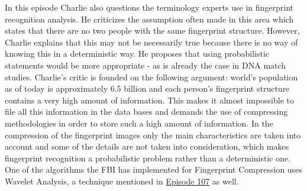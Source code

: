 In this episode Charlie also questions the terminology experts use in fingerprint recognition analysis. He criticizes the assumption often made in this area which states that there are no two people with the same fingerprint structure. However, Charlie explains that this may not be necessarily true because there is no way of knowing this in a deterministic way. He proposes that using probabilistic statements would be more appropriate - as is already the case in DNA match studies. Charlie's critic is founded on the following argument: world's population as of today is approximately 6.5 billion and each person's fingerprint structure contains a very high amount of information. This makes it almost impossible to file all this information in the data bases and demands the use of compressing methodologies in order to store such a high amount of information. In the compression of the fingerprint images only the main characteristics are taken into account and some of the details are not taken into consideration, which makes fingerprint recognition a probabilistic problem rather than a deterministic one. One of the algorithms the FBI has implemented for Fingerprint Compression uses Wavelet Analysis, a technique mentioned in \hyperref[107]{Episode 107} as well.

